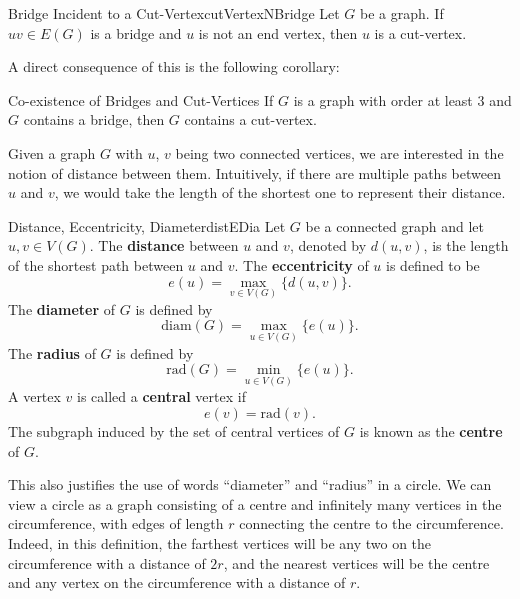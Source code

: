 \documentclass[math]{amznotes}
\theoremstyle{remark}
\newcommand{\0}{\mathbf{0}}
\newcommand{\1}{\mathbf{1}}
\begin{document}
\begin{probox}{Bridge Incident to a Cut-Vertex}{cutVertexNBridge}
    Let $G$ be a graph. If $uv \in E(G)$ is a bridge and $u$ is not an end vertex, then $u$ is a cut-vertex.
\end{probox}
A direct consequence of this is the following corollary:
\begin{corbox}{Co-existence of Bridges and Cut-Vertices}{}
    If $G$ is a graph with order at least $3$ and $G$ contains a bridge, then $G$ contains a cut-vertex.
\end{corbox}
Given a graph $G$ with $u$, $v$ being two connected vertices, we are interested in the notion of distance between them. Intuitively, if there are multiple paths between $u$ and $v$, we would take the length of the shortest one to represent their distance.
\begin{dfnbox}{Distance, Eccentricity, Diameter}{distEDia}
    Let $G$ be a connected graph and let $u, v \in V(G)$. The {\color{red} \textbf{distance}} between $u$ and $v$, denoted by $d(u, v)$, is the length of the shortest path between $u$ and $v$. The {\color{red} \textbf{eccentricity}} of $u$ is defined to be
    \begin{equation*}
        e(u) = \max_{v \in V(G)}\{d(u, v)\}.
    \end{equation*}
    The {\color{red} \textbf{diameter}} of $G$ is defined by
    \begin{equation*}
        \mathrm{diam}(G) = \max_{u \in V(G)}\{e(u)\}.
    \end{equation*}
    The {\color{red} \textbf{radius}} of $G$ is defined by
    \begin{equation*}
        \mathrm{rad}(G) = \min_{u \in V(G)}\{e(u)\}.
    \end{equation*}
    A vertex $v$ is called a {\color{red} \textbf{central}} vertex if
    \begin{equation*}
        e(v) = \mathrm{rad}(v).
    \end{equation*}
    The subgraph induced by the set of central vertices of $G$ is known as the {\color{red} \textbf{centre}} of $G$.
\end{dfnbox}
This also justifies the use of words ``diameter'' and ``radius'' in a circle. We can view a circle as a graph consisting of a centre and infinitely many vertices in the circumference, with edges of length $r$ connecting the centre to the circumference. Indeed, in this definition, the farthest vertices will be any two on the circumference with a distance of $2r$, and the nearest vertices will be the centre and any vertex on the circumference with a distance of $r$.
\end{document}
